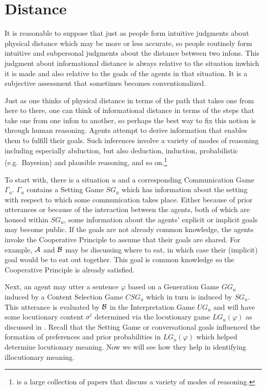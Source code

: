 \chapter{Distance} \label{ch:distance}

It is reasonable to suppose that just as people form intuitive judgments about physical distance which may be more or less accurate, so people routinely form intuitive and subpersonal judgments about the distance between two infons. This judgment about informational distance is always relative to the situation in\linebreak which it is made and also relative to the goals of the agents in that situation. It is a subjective assessment that sometimes becomes conventionalized.

Just as one thinks of physical distance in terms of the path that takes one from here to there, one can think of informational distance in terms of the steps that take one from one infon to another, so perhaps the best way to fix this notion is through human reasoning. Agents attempt to derive information that enables them to fulfill their goals. Such inferences involve a variety of modes of reasoning including especially abduction, but also deduction, induction, probabilistic (e.g.\ Bayesian) and plausible reasoning, and so on.\footnote{\citet{ar:r} is a large collection of papers that discuss a variety of modes of reasoning.}

To start with, there is a situation $u$ and a corresponding Communication Game $\Gamma_u$. $\Gamma_u$ contains a Setting Game $SG_u$ which has information about the setting with respect to which some communication takes place. Either because of prior utterances or because of the interaction between the agents, both of which are housed within $SG_u$, some information about the agents' explicit or implicit goals may become public. If the goals are not already common knowledge, the agents invoke the Cooperative Principle to assume that their goals are shared. For example, $\cal A$ and $\cal B$ may be discussing where to eat, in which case their (implicit) goal would be to eat out together. This goal is common knowledge so the Cooperative Principle is already satisfied.

Next, an agent may utter a sentence $\varphi$ based on a Generation Game $GG_u$ induced by a Content Selection Game $CSG_u$ which in turn is induced by $SG_u$. This utterance is evaluated by $\cal B$ in the Interpretation Game $UG_u$ and will have some locutionary content $\sigma^{\ell}$ determined via the locutionary game $LG_u(\varphi)$ as discussed in . Recall that the Setting Game or conversational goals influenced the formation of preferences and prior probabilities in $LG_u(\varphi)$ which helped determine locutionary meaning. Now we will see how they help in identifying illocutionary meaning.

